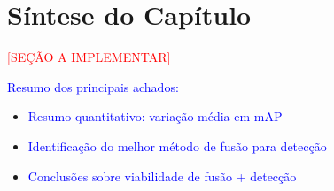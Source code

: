 \section{Síntese do Capítulo}

\textcolor{red}{[SEÇÃO A IMPLEMENTAR]}

\textcolor{blue}{Resumo dos principais achados:}
\begin{itemize}
    \item \textcolor{blue}{Resumo quantitativo: variação média em mAP}
    \item \textcolor{blue}{Identificação do melhor método de fusão para detecção}
    \item \textcolor{blue}{Conclusões sobre viabilidade de fusão + detecção}
\end{itemize}
